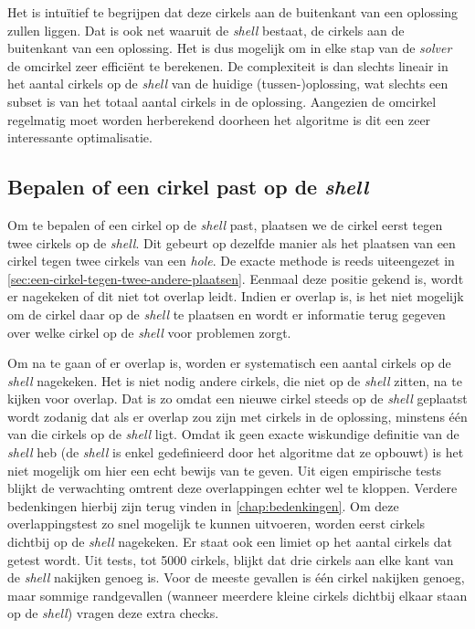 \documentclass[12pt,a4paper,oneside]{book}
\begin{document}
Het is intuïtief te begrijpen dat deze cirkels aan de buitenkant van een oplossing zullen liggen.
Dat is ook net waaruit de \textit{shell} bestaat, de cirkels aan de buitenkant van een oplossing.
Het is dus mogelijk om in elke stap van de \textit{solver} de omcirkel zeer efficiënt te berekenen.
De complexiteit is dan slechts lineair in het aantal cirkels op de \textit{shell} van de huidige (tussen-)oplossing, wat slechts een subset is van het totaal aantal cirkels in de oplossing.
Aangezien de omcirkel regelmatig moet worden herberekend  doorheen het algoritme is dit een zeer interessante optimalisatie.

\subsection{Bepalen of een cirkel past op de \textit{shell}} \label{sec:bepalen-of-een-cirkel-past-op-de-shell}

Om te bepalen of een cirkel op de \textit{shell} past, plaatsen we de cirkel eerst tegen twee cirkels op de \textit{shell}.
Dit gebeurt op dezelfde manier als het plaatsen van een cirkel tegen twee cirkels van een \textit{hole}.
De exacte methode is reeds uiteengezet in \autoref{sec:een-cirkel-tegen-twee-andere-plaatsen}.
Eenmaal deze positie gekend is, wordt er nagekeken of dit niet tot overlap leidt.
Indien er overlap is, is het niet mogelijk om de cirkel daar op de \textit{shell} te plaatsen en wordt er informatie terug gegeven over welke cirkel op de \textit{shell} voor problemen zorgt.

Om na te gaan of er overlap is, worden er systematisch een aantal cirkels op de \textit{shell} nagekeken.
Het is niet nodig andere cirkels, die niet op de \textit{shell} zitten, na te kijken voor overlap.
Dat is zo omdat een nieuwe cirkel steeds op de \textit{shell} geplaatst wordt zodanig dat als er overlap zou zijn met cirkels in de oplossing, minstens één van die cirkels op de \textit{shell} ligt.
Omdat ik geen exacte wiskundige definitie van de \textit{shell} heb (de \textit{shell} is enkel gedefinieerd door het algoritme dat ze opbouwt) is het niet mogelijk om hier een echt bewijs van te geven.
Uit eigen empirische tests blijkt de verwachting omtrent deze overlappingen echter wel te kloppen.
Verdere bedenkingen hierbij zijn terug vinden in \autoref{chap:bedenkingen}.
Om deze overlappingstest zo snel mogelijk te kunnen uitvoeren, worden eerst cirkels dichtbij op de \textit{shell} nagekeken.
Er staat ook een limiet op het aantal cirkels dat getest wordt.
Uit tests, tot 5000 cirkels, blijkt dat drie cirkels aan elke kant van de \textit{shell} nakijken genoeg is.
Voor de meeste gevallen is één cirkel nakijken genoeg, maar sommige randgevallen (wanneer meerdere kleine cirkels dichtbij elkaar staan op de \textit{shell}) vragen deze extra checks.
\end{document}
